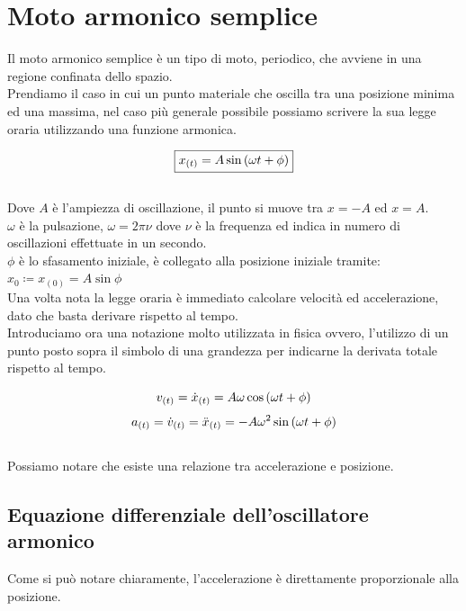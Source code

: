 \section{Moto armonico semplice}
Il moto armonico semplice è un tipo di moto, periodico, che avviene in una
regione confinata dello spazio.\\
Prendiamo il caso in cui un punto materiale che oscilla tra una posizione minima
ed una massima, nel caso più generale possibile possiamo scrivere la sua
legge oraria utilizzando una funzione armonica.

\begin{equation}
    \boxed{x_{(t)} = A\sin\left( \omega t +\phi\right)}
\label{eq:MA}
\end{equation}
\\
Dove $A$ è l'ampiezza di oscillazione, il punto si muove tra $ x = -A$ ed
$x = A$.\\
$\omega$ è la pulsazione, $\omega = 2\pi\nu$ dove $\nu$ è la frequenza ed
indica in numero di oscillazioni effettuate in un secondo.\\
$\phi$ è lo sfasamento iniziale, è collegato alla posizione iniziale tramite:
$ x_0 \coloneqq x_{(0)} = A\sin\phi$\\
Una volta nota la legge oraria è immediato calcolare velocità ed accelerazione,
dato che basta derivare rispetto al tempo.\\
Introduciamo ora una notazione molto utilizzata in fisica ovvero, l'utilizzo
di un punto posto sopra il simbolo di una grandezza per indicarne la
derivata totale rispetto al tempo.

\begin{equation}
    v_{(t)} = \dot x_{(t)} = A\omega\cos\left(\omega t +\phi\right)
\label{eq:MA_velocity}
\end{equation}
\begin{equation}
    a_{(t)} = \dot v_{(t)} = \ddot x_{(t)} = -A\omega^2\sin\left(\omega t +\phi\right)
\label{eq:MA_acceleration}
\end{equation}
\\
Possiamo notare che esiste una relazione tra accelerazione e posizione.

\subsection{Equazione differenziale dell'oscillatore armonico}

Come si può notare chiaramente, l'accelerazione è direttamente proporzionale
alla posizione.

